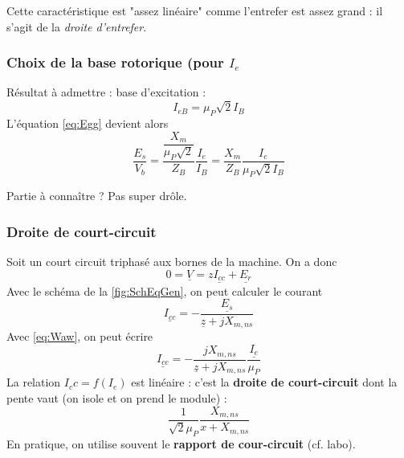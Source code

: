 	Cette caractéristique est "assez linéaire" comme l'entrefer est assez grand : il 
	s'agit de la \textit{droite d'entrefer}.
	
		\subsubsection{Choix de la base rotorique (pour $I_e$}
		Résultat à admettre : base d'excitation :
		\begin{equation}
		I_{eB} = \mu_P\sqrt{2}I_B
		\end{equation}
		L'équation \autoref{eq:Egg} devient alors 
		\begin{equation}
		\dfrac{E_s}{V_b} = \dfrac{\dfrac{X_m}{\mu_P\sqrt{2}}}{Z_B}\dfrac{I_e}{I_B} = 
		\dfrac{X_m}{Z_B}\dfrac{I_e}{\mu_P\sqrt{2}I_B}
		\end{equation}
		\begin{center}
		Partie à connaître ? Pas super drôle.
		\end{center}
		
		\subsubsection{Droite de court-circuit}
		Soit un court circuit triphasé aux bornes de la machine. On a donc 
		\begin{equation}
		0 = \underline{V} = z \underline{I_{cc}} + \underline{E_r}
		\end{equation}
		Avec le schéma de la \autoref{fig:SchEqGen}, on peut calculer le courant 
		\begin{equation}
		\underline{I_{cc}} = -\dfrac{\underline{E_s}}{\underline{z}+jX_{m,ns}}
		\end{equation}
		Avec \autoref{eq:Waw}, on peut écrire
		\begin{equation}
		\underline{I_{cc}} = -\dfrac{jX_{m,ns}}{\underline{z}+jX_{m,ns}}\dfrac{\underline{I_e}}{
		\mu_P}
		\end{equation}
		La relation $I_cc = f(I_e)$ est linéaire : c'est la \textbf{droite de 
		court-circuit}	dont la pente vaut (on isole et on prend le module) :
		\begin{equation}
		\dfrac{1}{\sqrt{2}\mu_P}\dfrac{X_{m,ns}}{x+X_{m,ns}}
		\end{equation}
		En pratique, on utilise souvent le \textbf{rapport de cour-circuit} (cf. labo).
		
		
